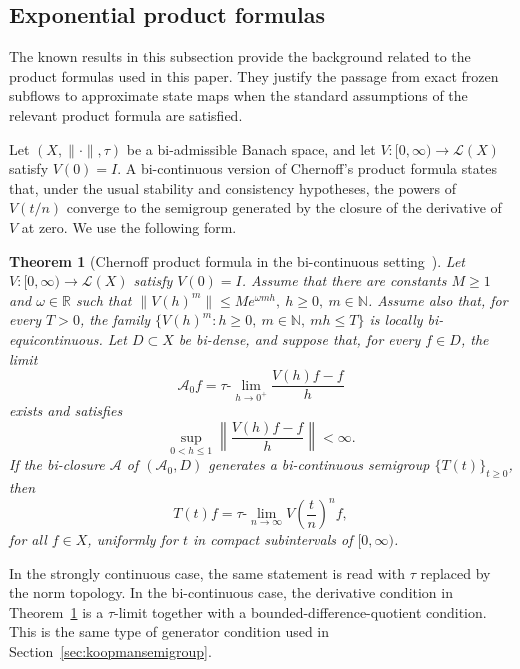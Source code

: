 \documentclass[preprint,1p,times,nopreprintline]{elsarticle}
\newtheorem{theorem}{Theorem}
\begin{document}
\subsection{Exponential product formulas}
\label{subsec:exp_prod_formulas}

The known results in this subsection provide the background related to the product formulas used in this paper. They justify the passage from exact frozen subflows to approximate state maps when the standard assumptions of the relevant product formula are satisfied.

Let $(X,\|\cdot\|,\tau)$ be a bi-admissible Banach space, and let $V:[0,\infty)\to\mathcal{L}(X)$ satisfy $V(0)=I$. A bi-continuous version of Chernoff's product formula states that, under the usual stability and consistency hypotheses, the powers of $V(t/n)$ converge to the semigroup generated by the closure of the derivative of $V$ at zero. We use the following form.

\begin{theorem}[Chernoff product formula in the bi-continuous setting~\citep{JD3}]
\label{CPFBi}
Let $V:[0,\infty)\to\mathcal{L}(X)$ satisfy $V(0)=I$. Assume that there are constants $M\ge 1$ and $\omega\in\mathbb{R}$ such that $\|V(h)^m\|\le M e^{\omega mh}, ~ h\ge 0, ~ m\in\mathbb{N}$. Assume also that, for every $T>0$, the family $\{V(h)^m: h\ge 0,\ m\in\mathbb{N},\ mh\le T\}$ is locally bi-equicontinuous. Let $D\subset X$ be bi-dense, and suppose that, for every $f\in D$, the limit
\[
\mathcal{A}_0 f
=
\tau\text{-}\lim_{h\to 0^+}\frac{V(h)f-f}{h}
\]
exists and satisfies
\[
\sup_{0<h\le 1}
\left\|
\frac{V(h)f-f}{h}
\right\|
<\infty .
\]
If the bi-closure $\mathcal{A}$ of $(\mathcal{A}_0,D)$ generates a bi-continuous semigroup $\{T(t)\}_{t\ge 0}$, then
\[
T(t)f
=
\tau\text{-}\lim_{n\to\infty}
V\!\left(\frac{t}{n}\right)^n f,
\]
for all $f\in X$, uniformly for $t$ in compact subintervals of $[0,\infty)$.
\end{theorem}

In the strongly continuous case, the same statement is read with $\tau$ replaced by the norm topology. In the bi-continuous case, the derivative condition in Theorem~\ref{CPFBi} is a $\tau$-limit together with a bounded-difference-quotient condition. This is the same type of generator condition used in Section~\ref{sec:koopmansemigroup}.
\end{document}
